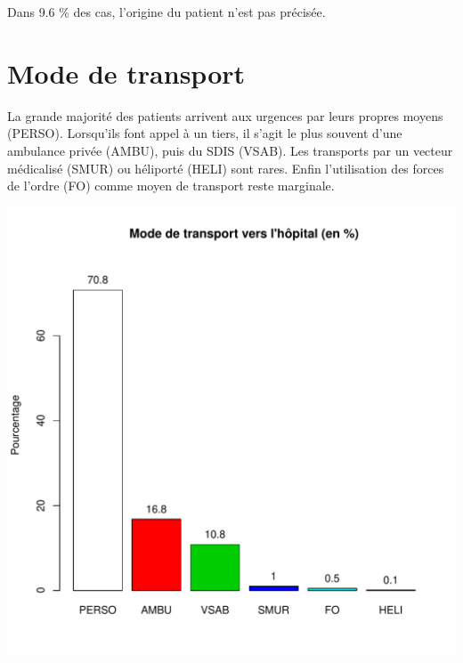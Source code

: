 \documentclass[12pt,english,french,twoside]{book}\usepackage[]{graphicx}\usepackage[]{color}
\makeatletter
\def\maxwidth{ %
  \ifdim\Gin@nat@width>\linewidth
    \linewidth
  \else
    \Gin@nat@width
  \fi
}
\makeatother
\begin{document}
Dans 9.6 \% des cas, l'origine du patient n'est pas précisée.

\section*{Mode de transport}

La grande majorité des patients arrivent aux urgences par leurs propres moyens (PERSO). Lorsqu'ils font appel à un tiers, il s'agit le plus souvent d'une ambulance privée (AMBU), puis du SDIS (VSAB). Les transports par un vecteur médicalisé (SMUR) ou héliporté (HELI) sont rares. Enfin l'utilisation des forces de l'ordre (FO) comme moyen de transport reste marginale.


\includegraphics[width=\maxwidth]{figure/transport-1} 
\end{document}

